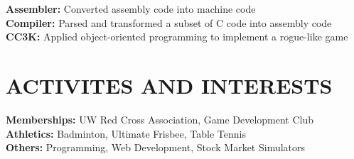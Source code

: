 \documentclass[letterpaper]{deedy-resume} %
\begin{document}
\begin{minipage}[t]{0.66\textwidth}

\textbf{Assembler:} Converted assembly code into machine code\\
\textbf{Compiler:} Parsed and transformed a subset of C code into assembly code \\
\textbf{CC3K:} Applied object-oriented programming to implement a rogue-like  game\\

\sectionspace %


\section{ACTIVITES AND INTERESTS} 
\textbf{Memberships:} UW Red Cross Association, Game Development Club\\
\textbf{Athletics:} Badminton, Ultimate Frisbee, Table Tennis \\
\textbf{Others:} Programming, Web Development, Stock Market Simulators\\


\sectionspace %


\end{minipage} %

\end{document}
